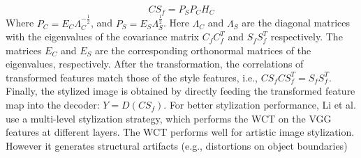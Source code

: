 \begin{equation}
CS_f = P_SP_CH_C
\end{equation}
Where $P_C=E_C\Lambda_C^{-\frac{1}{2}}$, and $P_S=E_S\Lambda_S^{\frac{1}{2}}$. Here $\Lambda_C$ and $\Lambda_S$ are the diagonal matrices with the eigenvalues of the covariance matrix $C_fC_f^T$ and $S_fS_f^T$ respectively. The matrices $E_C$ and $E_S$ are the corresponding orthonormal matrices of the eigenvalues, respectively. After the transformation, the correlations of
transformed features match those of the style features, i.e., $CS_fCS_f^T=S_fS_f^T$. Finally, the stylized image is obtained by directly feeding the transformed feature
map into the decoder: $Y = D(CS_f)$. For better stylization performance, Li et
al. \cite{bib11} use a multi-level stylization strategy, which performs the WCT on the
VGG features at different layers.
The WCT performs well for artistic image stylization. However it generates
structural artifacts (e.g., distortions on object boundaries)